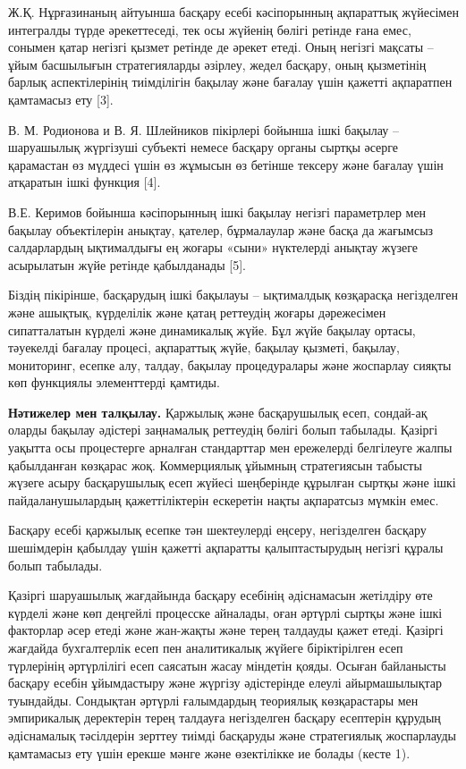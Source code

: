 \begin{multicols}{2}
Ж.Қ. Нұрғазинаның айтуынша басқару есебі кәсіпорынның ақпараттық
жүйесімен интегралды түрде әрекеттеседі, тек осы жүйенің бөлігі ретінде
ғана емес, сонымен қатар негізгі қызмет ретінде де әрекет етеді. Оның
негізгі мақсаты -- ұйым басшылығын стратегияларды әзірлеу, жедел
басқару, оның қызметінің барлық аспектілерінің тиімділігін бақылау және
бағалау үшін қажетті ақпаратпен қамтамасыз ету {[}3{]}.

В. М. Родионова и В. Я. Шлейников пікірлері бойынша ішкі бақылау --
шаруашылық жүргізуші субъекті немесе басқару органы сыртқы әсерге
қарамастан өз мүддесі үшін өз жұмысын өз бетінше тексеру және бағалау
үшін атқаратын ішкі функция {[}4{]}.

В.Е. Керимов бойынша кәсіпорынның ішкі бақылау негізгі параметрлер мен
бақылау объектілерін анықтау, қателер, бұрмалаулар және басқа да
жағымсыз салдарлардың ықтималдығы ең жоғары «сыни» нүктелерді анықтау
жүзеге асырылатын жүйе ретінде қабылданады {[}5{]}.

Біздің пікірінше, басқарудың ішкі бақылауы -- ықтималдық көзқарасқа
негізделген және ашықтық, күрделілік және қатаң реттеудің жоғары
дәрежесімен сипатталатын күрделі және динамикалық жүйе. Бұл жүйе бақылау
ортасы, тәуекелді бағалау процесі, ақпараттық жүйе, бақылау қызметі,
бақылау, мониторинг, есепке алу, талдау, бақылау процедуралары және
жоспарлау сияқты көп функциялы элементтерді қамтиды.

{\bfseries Нәтижелер мен талқылау.} Қаржылық және басқарушылық есеп,
сондай-ақ оларды бақылау әдістері заңнамалық реттеудің бөлігі болып
табылады. Қазіргі уақытта осы процестерге арналған стандарттар мен
ережелерді белгілеуге жалпы қабылданған көзқарас жоқ. Коммерциялық
ұйымның стратегиясын табысты жүзеге асыру басқарушылық есеп жүйесі
шеңберінде құрылған сыртқы және ішкі пайдаланушылардың қажеттіліктерін
ескеретін нақты ақпаратсыз мүмкін емес.

Басқару есебі қаржылық есепке тән шектеулерді еңсеру, негізделген
басқару шешімдерін қабылдау үшін қажетті ақпаратты қалыптастырудың
негізгі құралы болып табылады.

Қазіргі шаруашылық жағдайында басқару есебінің әдіснамасын жетілдіру өте
күрделі және көп деңгейлі процесске айналады, оған әртүрлі сыртқы және
ішкі факторлар әсер етеді және жан-жақты және терең талдауды қажет
етеді. Қазіргі жағдайда бухгалтерлік есеп пен аналитикалық жүйеге
біріктірілген есеп түрлерінің әртүрлілігі есеп саясатын жасау міндетін
қояды. Осыған байланысты басқару есебін ұйымдастыру және жүргізу
әдістерінде елеулі айырмашылықтар туындайды. Сондықтан әртүрлі
ғалымдардың теориялық көзқарастары мен эмпирикалық деректерін терең
талдауға негізделген басқару есептерін құрудың әдіснамалық тәсілдерін
зерттеу тиімді басқаруды және стратегиялық жоспарлауды қамтамасыз ету
үшін ерекше мәнге және өзектілікке ие болады (кесте 1).
\end{multicols}


